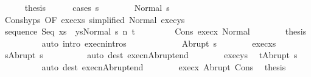 \begin{isabellebody}
\ \ \ \ \isamarkupfalse%
\ {\isacharquery}thesis\isanewline
\ \ \ \ \isamarkupfalse%
\ {\isacharparenleft}cases\ s{\isacharprime}{\isacharprime}{\isacharparenright}\isanewline
\ \ \ \ \ \ \isamarkupfalse%
\ {\isacharparenleft}Normal\ s{\isacharprime}{\isacharprime}{\isacharprime}{\isacharparenright}\isanewline
\ \ \ \ \ \ \isamarkupfalse%
\ Cons{\isachardot}hyps\ {\isacharbrackleft}OF\ exec{\isacharunderscore}xs\ {\isacharbrackleft}simplified\ Normal{\isacharbrackright}\ exec{\isacharunderscore}ys{\isacharbrackright}\isanewline
\ \ \ \ \ \ \isamarkupfalse%
\ {\isachardoublequoteopen}{\isasymGamma}{\isasymturnstile}{\isasymlangle}sequence\ Seq\ {\isacharparenleft}xs\ {\isacharat}\ ys{\isacharparenright}{\isacharcomma}Normal\ s{\isacharprime}{\isacharprime}{\isacharprime}{\isasymrangle}\ {\isacharequal}n{\isasymRightarrow}\ t{\isachardoublequoteclose}\ \isacommand{{\isachardot}}\isamarkupfalse%
\isanewline
\ \ \ \ \ \ \isamarkupfalse%
\ Cons\ exec{\isacharunderscore}x\ Normal\isanewline
\ \ \ \ \ \ \isamarkupfalse%
\ {\isacharquery}thesis\isanewline
\ \ \ \ \ \ \ \ \isamarkupfalse%
\ {\isacharparenleft}auto\ intro{\isacharcolon}\ execn{\isachardot}intros{\isacharparenright}\isanewline
\ \ \ \ \isamarkupfalse%
\isanewline
\ \ \ \ \ \ \isamarkupfalse%
\ {\isacharparenleft}Abrupt\ s{\isacharprime}{\isacharprime}{\isacharprime}{\isacharparenright}\isanewline
\ \ \ \ \ \ \isamarkupfalse%
\ exec{\isacharunderscore}xs\ \isamarkupfalse%
\ {\isachardoublequoteopen}s{\isacharprime}{\isacharequal}Abrupt\ s{\isacharprime}{\isacharprime}{\isacharprime}{\isachardoublequoteclose}\isanewline
\ \ \ \ \ \ \ \ \isamarkupfalse%
\ {\isacharparenleft}auto\ dest{\isacharcolon}\ execn{\isacharunderscore}Abrupt{\isacharunderscore}end{\isacharparenright}\isanewline
\ \ \ \ \ \ \isamarkupfalse%
\ exec{\isacharunderscore}ys\ \isamarkupfalse%
\ {\isachardoublequoteopen}t{\isacharequal}Abrupt\ s{\isacharprime}{\isacharprime}{\isacharprime}{\isachardoublequoteclose}\isanewline
\ \ \ \ \ \ \ \ \isamarkupfalse%
\ {\isacharparenleft}auto\ dest{\isacharcolon}\ execn{\isacharunderscore}Abrupt{\isacharunderscore}end{\isacharparenright}\isanewline
\ \ \ \ \ \ \isamarkupfalse%
\ exec{\isacharunderscore}x\ Abrupt\ Cons\ \isamarkupfalse%
\ {\isacharquery}thesis\isanewline
\ \ \ \ \ \ \ \ \isamarkupfalse%

\end{isabellebody}
